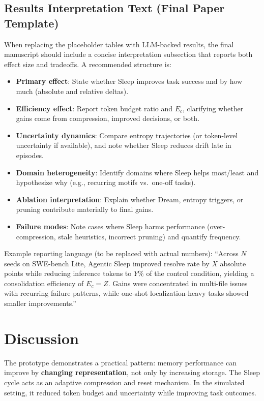 \documentclass{article}
\begin{document}
\subsection{Results Interpretation Text (Final Paper Template)}

When replacing the placeholder tables with LLM-backed results, the final manuscript should include a concise interpretation subsection that reports both effect size and tradeoffs. A recommended structure is:

\begin{itemize}[leftmargin=1.25em]
\item \textbf{Primary effect}: State whether Sleep improves task success and by how much (absolute and relative deltas).
\item \textbf{Efficiency effect}: Report token budget ratio and $E_c$, clarifying whether gains come from compression, improved decisions, or both.
\item \textbf{Uncertainty dynamics}: Compare entropy trajectories (or token-level uncertainty if available), and note whether Sleep reduces drift late in episodes.
\item \textbf{Domain heterogeneity}: Identify domains where Sleep helps most/least and hypothesize why (e.g., recurring motifs vs.\ one-off tasks).
\item \textbf{Ablation interpretation}: Explain whether Dream, entropy triggers, or pruning contribute materially to final gains.
\item \textbf{Failure modes}: Note cases where Sleep harms performance (over-compression, stale heuristics, incorrect pruning) and quantify frequency.
\end{itemize}

Example reporting language (to be replaced with actual numbers): ``Across $N$ seeds on SWE-bench Lite, Agentic Sleep improved resolve rate by $X$ absolute points while reducing inference tokens to $Y\%$ of the control condition, yielding a consolidation efficiency of $E_c = Z$. Gains were concentrated in multi-file issues with recurring failure patterns, while one-shot localization-heavy tasks showed smaller improvements.''

\section{Discussion}

The prototype demonstrates a practical pattern: memory performance can improve by \textbf{changing representation}, not only by increasing storage. The Sleep cycle acts as an adaptive compression and reset mechanism. In the simulated setting, it reduced token budget and uncertainty while improving task outcomes.
\end{document}
